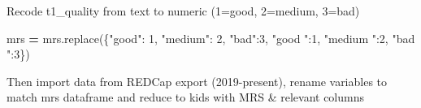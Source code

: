 \documentclass[
]{article}
\newenvironment{Shaded}{\begin{snugshade}}{\end{snugshade}}
\newcommand{\DecValTok}[1]{\textcolor[rgb]{0.00,0.00,0.81}{#1}}
\newcommand{\NormalTok}[1]{#1}
\newcommand{\OperatorTok}[1]{\textcolor[rgb]{0.81,0.36,0.00}{\textbf{#1}}}
\newcommand{\StringTok}[1]{\textcolor[rgb]{0.31,0.60,0.02}{#1}}
\begin{document}
Recode t1\_quality from text to numeric (1=good, 2=medium, 3=bad)

\begin{Shaded}
\begin{Highlighting}[]
\NormalTok{mrs }\OperatorTok{=}\NormalTok{ mrs.replace(\{}\StringTok{"good"}\NormalTok{: }\DecValTok{1}\NormalTok{, }\StringTok{"medium"}\NormalTok{: }\DecValTok{2}\NormalTok{, }\StringTok{"bad"}\NormalTok{:}\DecValTok{3}\NormalTok{, }\StringTok{"good "}\NormalTok{:}\DecValTok{1}\NormalTok{, }\StringTok{"medium "}\NormalTok{:}\DecValTok{2}\NormalTok{, }\StringTok{"bad "}\NormalTok{:}\DecValTok{3}\NormalTok{\})}
\end{Highlighting}
\end{Shaded}

Then import data from REDCap export (2019-present), rename variables to
match mrs dataframe and reduce to kids with MRS \& relevant columns
\end{document}
